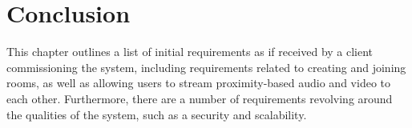 \section{Conclusion}

This chapter outlines a list of initial requirements as if received by a client commissioning the system, including requirements related to creating and joining rooms, as well as allowing users to stream proximity-based audio and video to each other. Furthermore, there are a number of requirements revolving around the qualities of the system, such as a security and scalability.